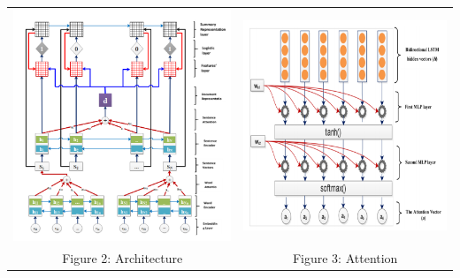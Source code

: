 \documentclass[20pt,margin=1in,innermargin=-4.5in,blockverticalspace=-0.25in]{tikzposter}
\begin{document}
\begin{columns}
{        \begin{tabular}{c c}
            \includegraphics[scale=1.2]{images/Architecture.PNG} & \includegraphics[scale=1.2]{images/Attention.PNG} \\
            Figure 2: Architecture & Figure 3: Attention
        \end{tabular}
    }
    

        
\end{columns}
\end{document}
